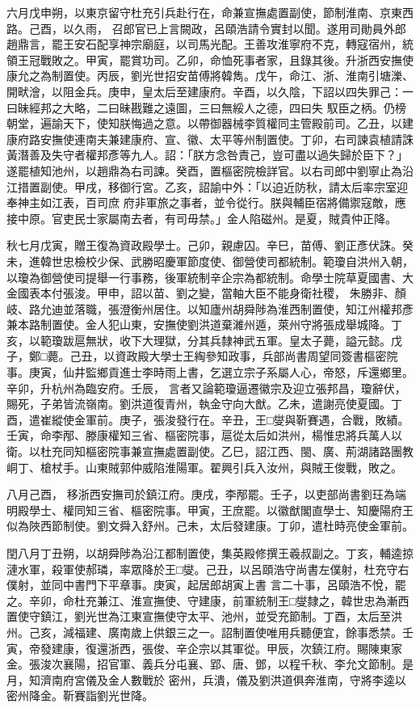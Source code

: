 \begin{pinyinscope}
 六月戊申朔，以東京留守杜充引兵赴行在，命兼宣撫處置副使，節制淮南、京東西路。己酉，以久雨，
 召郎官已上言闕政，呂頤浩請令實封以聞。遂用司勛員外郎趙鼎言，罷王安石配享神宗廟庭，以司馬光配。王善攻淮寧府不克，轉寇宿州，統領王冠戰敗之。甲寅，罷賞功司。乙卯，命恤死事者家，且錄其後。升浙西安撫使康允之為制置使。丙辰，劉光世招安苗傅將韓雋。戊午，命江、浙、淮南引塘濼、開畎澮，以阻金兵。庚申，皇太后至建康府。辛酉，以久陰，下詔以四失罪己：一曰昧經邦之大略，二曰昧戡難之遠圖，三曰無綏人之德，四曰失
 馭臣之柄。仍榜朝堂，遍諭天下，使知朕悔過之意。以帶御器械李質權同主管殿前司。乙丑，以建康府路安撫使連南夫兼建康府、宣、徽、太平等州制置使。丁卯，右司諫袁植請誅黃潛善及失守者權邦彥等九人。詔：「朕方念咎責己，豈可盡以過失歸於臣下？」遂罷植知池州，以趙鼎為右司諫。癸酉，置樞密院檢詳官。以右司郎中劉寧止為沿江措置副使。甲戌，移御行宮。乙亥，詔諭中外：「以迫近防秋，請太后率宗室迎奉神主如江表，百司庶
 府非軍旅之事者，並令從行。朕與輔臣宿將備禦寇敵，應接中原。官吏民士家屬南去者，有司毋禁。」金人陷磁州。是夏，賊貴仲正降。



 秋七月戊寅，贈王復為資政殿學士。己卯，親慮囚。辛巳，苗傅、劉正彥伏誅。癸未，進韓世忠檢校少保、武勝昭慶軍節度使、御營使司都統制。範瓊自洪州入朝，以瓊為御營使司提舉一行事務，後軍統制辛企宗為都統制。命學士院草夏國書、大金國表本付張浚。甲申，詔以苗、劉之變，當軸大臣不能身衛社稷，
 朱勝非、顏岐、路允迪並落職，張澄衡州居住。以知廬州胡舜陟為淮西制置使，知江州權邦彥兼本路制置使。金人犯山東，安撫使劉洪道棄濰州遁，萊州守將張成舉城降。丁亥，以範瓊跋扈無狀，收下大理獄，分其兵隸神武五軍。皇太子薨，謚元懿。戊子，鄭□薨。己丑，以資政殿大學士王綯參知政事，兵部尚書周望同簽書樞密院事。庚寅，仙井監鄉貢進士李時雨上書，乞選立宗子系屬人心，帝怒，斥還鄉里。辛卯，升杭州為臨安府。壬辰，
 言者又論範瓊逼遷徽宗及迎立張邦昌，瓊辭伏，賜死，子弟皆流嶺南。劉洪道復青州，執金守向大猷。乙未，遣謝亮使夏國。丁酉，遣崔縱使金軍前。庚子，張浚發行在。辛丑，王□燮與靳賽遇，合戰，敗績。壬寅，命李邴、滕康權知三省、樞密院事，扈從太后如洪州，楊惟忠將兵萬人以衛。以杜充同知樞密院事兼宣撫處置副使。乙巳，詔江西、閩、廣、荊湖諸路團教峒丁、槍杖手。山東賊郭仲威陷淮陽軍。翟興引兵入汝州，與賊王俊戰，敗之。



 八月己酉，
 移浙西安撫司於鎮江府。庚戌，李邴罷。壬子，以吏部尚書劉玨為端明殿學士、權同知三省、樞密院事。甲寅，王庶罷。以徽猷閣直學士、知慶陽府王似為陜西節制使。劉文舜入舒州。己未，太后發建康。丁卯，遣杜時亮使金軍前。



 閏八月丁丑朔，以胡舜陟為沿江都制置使，集英殿修撰王羲叔副之。丁亥，輔逵掠漣水軍，殺軍使郝璘，率眾降於王□燮。己丑，以呂頤浩守尚書左僕射，杜充守右僕射，並同中書門下平章事。庚寅，起居郎胡寅上書
 言二十事，呂頤浩不悅，罷之。辛卯，命杜充兼江、淮宣撫使、守建康，前軍統制王□燮隸之，韓世忠為漸西置使守鎮江，劉光世為江東宣撫使守太平、池州，並受充節制。丁酉，太后至洪州。己亥，減福建、廣南歲上供銀三之一。詔制置使唯用兵聽便宜，餘事悉禁。壬寅，帝發建康，復還浙西，張俊、辛企宗以其軍從。甲辰，次鎮江府。賜陳東家金。張浚次襄陽，招官軍、義兵分屯襄、郢、唐、鄧，以程千秋、李允文節制。是月，知濟南府宮儀及金人數戰於
 密州，兵潰，儀及劉洪道俱奔淮南，守將李逵以密州降金。靳賽詣劉光世降。




\end{pinyinscope}
